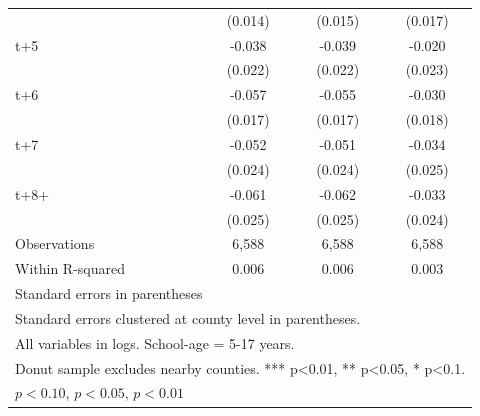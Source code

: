 \begin{table}[htbp]
\begin{tabular}{l*{3}{c}}
            &     (0.014)         &     (0.015)         &     (0.017)         \\
[1em]
t+5         &      -0.038\sym{*}  &      -0.039\sym{*}  &      -0.020         \\
            &     (0.022)         &     (0.022)         &     (0.023)         \\
[1em]
t+6         &      -0.057\sym{***}&      -0.055\sym{***}&      -0.030         \\
            &     (0.017)         &     (0.017)         &     (0.018)         \\
[1em]
t+7         &      -0.052\sym{**} &      -0.051\sym{**} &      -0.034         \\
            &     (0.024)         &     (0.024)         &     (0.025)         \\
[1em]
t+8+        &      -0.061\sym{**} &      -0.062\sym{**} &      -0.033         \\
            &     (0.025)         &     (0.025)         &     (0.024)         \\
\hline
Observations&       6,588         &       6,588         &       6,588         \\
Within R-squared&       0.006         &       0.006         &       0.003         \\
\hline\hline
\multicolumn{4}{l}{\footnotesize Standard errors in parentheses}\\
\multicolumn{4}{l}{\footnotesize Standard errors clustered at county level in parentheses.}\\
\multicolumn{4}{l}{\footnotesize All variables in logs. School-age = 5-17 years.}\\
\multicolumn{4}{l}{\footnotesize Donut sample excludes nearby counties. *** p<0.01, ** p<0.05, * p<0.1.}\\
\multicolumn{4}{l}{\footnotesize \sym{*} \(p<0.10\), \sym{**} \(p<0.05\), \sym{***} \(p<0.01\)}\\
\end{tabular}
\end{table}
